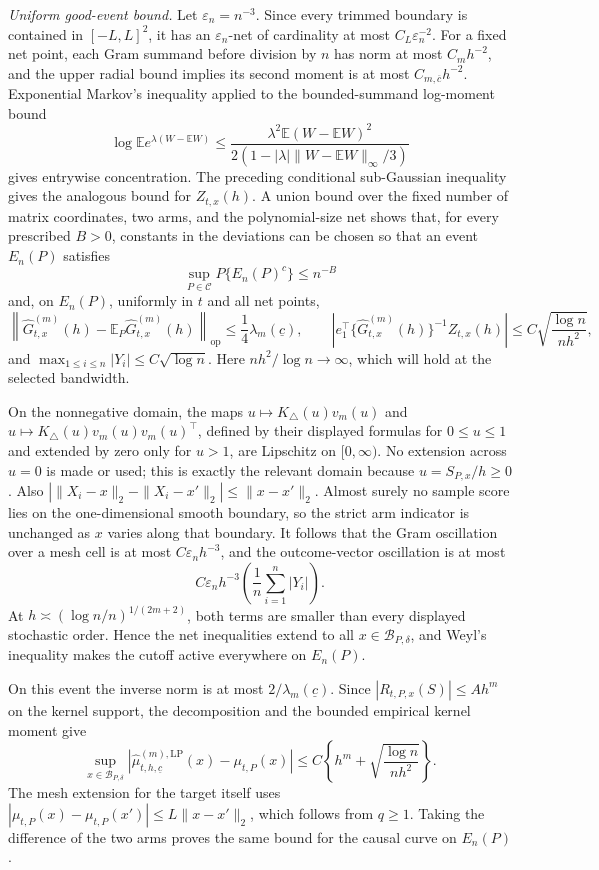 \emph{Uniform good-event bound.}
Let \(\varepsilon_n=n^{-3}\).  Since every trimmed boundary is contained in \([-L,L]^2\), it has an \(\varepsilon_n\)-net of cardinality at most \(C_L\varepsilon_n^{-2}\).  For a fixed net point, each Gram summand before division by \(n\) has norm at most \(C_mh^{-2}\), and the upper radial bound implies its second moment is at most \(C_{m,\overline c}h^{-2}\).  Exponential Markov's inequality applied to the bounded-summand log-moment bound
\[
 \log\mathbb E e^{\lambda(W-\mathbb EW)}
 \leq\frac{\lambda^2\mathbb E(W-\mathbb EW)^2}
 {2(1-|\lambda|\|W-\mathbb EW\|_\infty/3)}
\]
gives entrywise concentration.  The preceding conditional sub-Gaussian inequality gives the analogous bound for \(Z_{t,x}(h)\).  A union bound over the fixed number of matrix coordinates, two arms, and the polynomial-size net shows that, for every prescribed \(B>0\), constants in the deviations can be chosen so that an event \(E_n(P)\) satisfies
\[
 \sup_{P\in\mathcal C}P\{E_n(P)^c\}\leq n^{-B}
\]
and, on \(E_n(P)\), uniformly in \(t\) and all net points,
\[
 \left\|\widehat G^{(m)}_{t,x}(h)
 -\mathbb E_P\widehat G^{(m)}_{t,x}(h)\right\|_{\mathrm{op}}
 \leq\frac14\lambda_m(\underline c),
 \qquad
 \left|e_1^\top\{\widehat G^{(m)}_{t,x}(h)\}^{-1}Z_{t,x}(h)\right|
 \leq C\sqrt{\frac{\log n}{nh^2}},
\]
and \(\max_{1\leq i\leq n}|Y_i|\leq C\sqrt{\log n}\).  Here \(nh^2/\log n\to\infty\), which will hold at the selected bandwidth.

On the nonnegative domain, the maps \(u\mapsto K_\triangle(u)v_m(u)\) and \(u\mapsto K_\triangle(u)v_m(u)v_m(u)^\top\), defined by their displayed formulas for \(0\leq u\leq1\) and extended by zero only for \(u>1\), are Lipschitz on \([0,\infty)\).  No extension across \(u=0\) is made or used; this is exactly the relevant domain because \(u=S_{P,x}/h\geq0\).  Also \(|\|X_i-x\|_2-\|X_i-x'\|_2|\leq\|x-x'\|_2\).  Almost surely no sample score lies on the one-dimensional smooth boundary, so the strict arm indicator is unchanged as \(x\) varies along that boundary.  It follows that the Gram oscillation over a mesh cell is at most \(C\varepsilon_nh^{-3}\), and the outcome-vector oscillation is at most
\[
 C\varepsilon_nh^{-3}\left(\frac1n\sum_{i=1}^n|Y_i|\right).
\]
At \(h\asymp(\log n/n)^{1/(2m+2)}\), both terms are smaller than every displayed stochastic order.  Hence the net inequalities extend to all \(x\in\mathcal B_{P,\delta}\), and Weyl's inequality makes the cutoff active everywhere on \(E_n(P)\).

On this event the inverse norm is at most \(2/\lambda_m(\underline c)\).  Since \(|R_{t,P,x}(S)|\leq Ah^m\) on the kernel support, the decomposition and the bounded empirical kernel moment give
\[
 \sup_{x\in\mathcal B_{P,\delta}}
 \left|\widehat\mu^{(m),\mathrm{LP}}_{t,h,\underline c}(x)-\mu_{t,P}(x)\right|
 \leq C\left\{h^m+\sqrt{\frac{\log n}{nh^2}}\right\}.
\]
The mesh extension for the target itself uses
\(|\mu_{t,P}(x)-\mu_{t,P}(x')|\leq L\|x-x'\|_2\), which follows from \(q\geq1\).  Taking the difference of the two arms proves the same bound for the causal curve on \(E_n(P)\).

